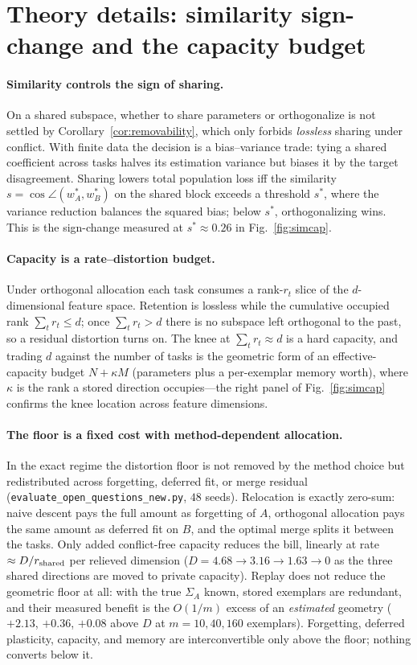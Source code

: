 \documentclass[10pt,a4paper]{article}
\theoremstyle{plain}
\theoremstyle{definition}
\newcommand{\Sig}{\Sigma}
\newcommand{\sstar}{s^{\ast}}
\begin{document}
\section{Theory details: similarity sign-change and the capacity budget}
\label{si:theory}
\paragraph{Similarity controls the sign of sharing.} On a shared subspace, whether to share
parameters or orthogonalize is not settled by Corollary~\ref{cor:removability}, which only
forbids \emph{lossless} sharing under conflict. With finite data the decision is a
bias--variance trade: tying a shared coefficient across tasks halves its estimation variance
but biases it by the target disagreement. Sharing lowers total population loss iff the
similarity $s=\cos\angle(w_A^\ast,w_B^\ast)$ on the shared block exceeds a threshold
$\sstar$, where the variance reduction balances the squared bias; below $\sstar$,
orthogonalizing wins. This is the sign-change measured at $\sstar\approx0.26$ in
Fig.~\ref{fig:simcap}.

\paragraph{Capacity is a rate--distortion budget.} Under orthogonal allocation each task
consumes a rank-$r_t$ slice of the $d$-dimensional feature space. Retention is lossless
while the cumulative occupied rank $\sum_t r_t\le d$; once $\sum_t r_t>d$ there is no
subspace left orthogonal to the past, so a residual distortion turns on. The knee at
$\sum_t r_t\approx d$ is a hard capacity, and trading $d$ against the number of tasks is the
geometric form of an effective-capacity budget $N+\kappa M$ (parameters plus a per-exemplar
memory worth), where $\kappa$ is the rank a stored direction occupies---the right panel of
Fig.~\ref{fig:simcap} confirms the knee location across feature dimensions.

\paragraph{The floor is a fixed cost with method-dependent allocation.} In the exact regime the
distortion floor  is not removed by the method choice but redistributed across forgetting, deferred fit,
or merge residual (\texttt{evaluate\_open\_questions\_new.py}, $48$ seeds).
Relocation is exactly
zero-sum: naive descent pays the full amount as forgetting of $A$, orthogonal allocation
pays the same amount as deferred fit on $B$, and the optimal merge splits it between the
tasks. Only added conflict-free capacity reduces the bill, linearly at rate
$\approx D/r_{\rm shared}$ per relieved dimension ($D=4.68\to3.16\to1.63\to0$ as the three
shared directions are moved to private capacity). Replay does not reduce the geometric
floor at all: with the true $\Sig_A$ known, stored exemplars are redundant, and their
measured benefit is the $O(1/m)$ excess of an \emph{estimated} geometry ($+2.13$, $+0.36$,
$+0.08$ above $D$ at $m=10,40,160$ exemplars). Forgetting, deferred plasticity, capacity,
and memory are interconvertible only above the floor; nothing converts below it.
\end{document}

